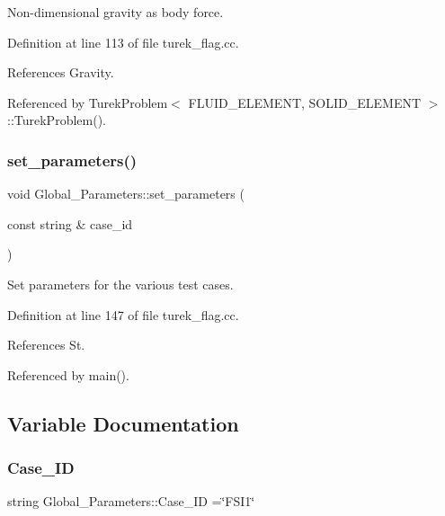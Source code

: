 Non-\/dimensional gravity as body force. 



Definition at line 113 of file turek\+\_\+flag.\+cc.



References Gravity.



Referenced by Turek\+Problem$<$ F\+L\+U\+I\+D\+\_\+\+E\+L\+E\+M\+E\+N\+T, S\+O\+L\+I\+D\+\_\+\+E\+L\+E\+M\+E\+N\+T $>$\+::\+Turek\+Problem().

\mbox{\label{namespaceGlobal__Parameters_a8c333f9041cad78d5c0160a8e2c169f5}} 
\subsubsection{\texorpdfstring{set\+\_\+parameters()}{set\_parameters()}}
{\footnotesize\ttfamily void Global\+\_\+\+Parameters\+::set\+\_\+parameters (\begin{DoxyParamCaption}\item[{const string \&}]{case\+\_\+id }\end{DoxyParamCaption})}



Set parameters for the various test cases. 



Definition at line 147 of file turek\+\_\+flag.\+cc.



References St.



Referenced by main().



\subsection{Variable Documentation}
\mbox{\label{namespaceGlobal__Parameters_a887474a9be53363806b4de417f660dba}} 
\subsubsection{\texorpdfstring{Case\+\_\+\+ID}{Case\_ID}}
{\footnotesize\ttfamily string Global\+\_\+\+Parameters\+::\+Case\+\_\+\+ID =\char`\"{}F\+S\+I1\char`\"{}}



